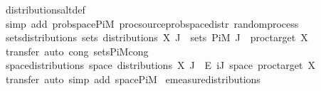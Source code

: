 \begin{isabellebody}
\endisadelimproof
%
\isatagproof
{}\isamarkupfalse%
\ distributions{\isacharunderscore}{\kern0pt}altdef\isanewline
\ \ \isamarkupfalse%
\ {\isacharparenleft}{\kern0pt}simp\ add{\isacharcolon}{\kern0pt}\ prob{\isacharunderscore}{\kern0pt}space{\isacharunderscore}{\kern0pt}PiM\ proc{\isacharunderscore}{\kern0pt}source{\isachardot}{\kern0pt}prob{\isacharunderscore}{\kern0pt}space{\isacharunderscore}{\kern0pt}distr\ random{\isacharunderscore}{\kern0pt}process{\isacharparenright}{\kern0pt}%
\endisatagproof
{\isafoldproof}%
%
\isadelimproof
\isanewline
%
\endisadelimproof
\isanewline
{}\isamarkupfalse%
\ sets{\isacharunderscore}{\kern0pt}distributions{\isacharcolon}{\kern0pt}\ {\isachardoublequoteopen}sets\ {\isacharparenleft}{\kern0pt}distributions\ X\ J{\isacharparenright}{\kern0pt}\ {\isacharequal}{\kern0pt}\ sets\ {\isacharparenleft}{\kern0pt}PiM\ J\ {\isacharparenleft}{\kern0pt}{\isasymlambda}{\isacharunderscore}{\kern0pt}{\isachardot}{\kern0pt}\ {\isacharparenleft}{\kern0pt}proc{\isacharunderscore}{\kern0pt}target\ X{\isacharparenright}{\kern0pt}{\isacharparenright}{\kern0pt}{\isacharparenright}{\kern0pt}{\isachardoublequoteclose}\isanewline
%
\isadelimproof
\ \ %
\endisadelimproof
%
\isatagproof
{}\isamarkupfalse%
\ {\isacharparenleft}{\kern0pt}transfer{\isacharcomma}{\kern0pt}\ auto\ cong{\isacharcolon}{\kern0pt}\ sets{\isacharunderscore}{\kern0pt}PiM{\isacharunderscore}{\kern0pt}cong{\isacharparenright}{\kern0pt}%
\endisatagproof
{\isafoldproof}%
%
\isadelimproof
\isanewline
%
\endisadelimproof
\isanewline
{}\isamarkupfalse%
\ space{\isacharunderscore}{\kern0pt}distributions{\isacharcolon}{\kern0pt}\ {\isachardoublequoteopen}space\ {\isacharparenleft}{\kern0pt}distributions\ X\ J{\isacharparenright}{\kern0pt}\ {\isacharequal}{\kern0pt}\ {\isacharparenleft}{\kern0pt}{\isasymPi}\isactrlsub E\ i{\isasymin}J{\isachardot}{\kern0pt}\ space\ {\isacharparenleft}{\kern0pt}proc{\isacharunderscore}{\kern0pt}target\ X{\isacharparenright}{\kern0pt}{\isacharparenright}{\kern0pt}{\isachardoublequoteclose}\isanewline
%
\isadelimproof
\ \ %
\endisadelimproof
%
\isatagproof
{}\isamarkupfalse%
\ {\isacharparenleft}{\kern0pt}transfer{\isacharcomma}{\kern0pt}\ auto\ simp\ add{\isacharcolon}{\kern0pt}\ space{\isacharunderscore}{\kern0pt}PiM{\isacharparenright}{\kern0pt}%
\endisatagproof
{\isafoldproof}%
%
\isadelimproof
\isanewline
%
\endisadelimproof
\isanewline
{}\isamarkupfalse%
\ emeasure{\isacharunderscore}{\kern0pt}distributions{\isacharcolon}{\kern0pt}\isanewline

\end{isabellebody}
